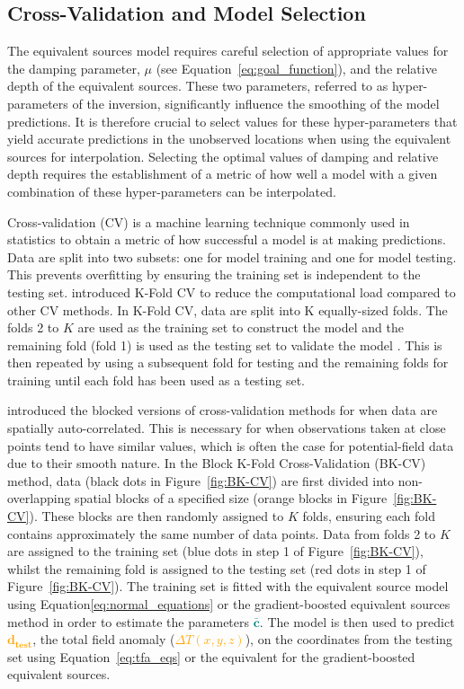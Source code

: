 \subsection{Cross-Validation and Model Selection}

The equivalent sources model requires careful selection of appropriate values for the damping parameter, $\mu$ (see Equation~\ref{eq:goal_function}), and the relative depth of the equivalent sources. 
These two parameters, referred to as hyper-parameters of the inversion, significantly influence the smoothing of the model predictions. It is therefore crucial to select values for these hyper-parameters that yield accurate predictions in the unobserved locations when using the equivalent sources for interpolation. Selecting the optimal values of damping and relative depth requires the establishment of a metric of how well a model with a given combination of these hyper-parameters can be interpolated.

Cross-validation (CV) is a machine learning technique commonly used in statistics to obtain a metric of how successful a model is at making predictions. Data are split into two subsets: one for model training and one for model testing. This prevents overfitting by ensuring the training set is independent to the testing set. \citet{Geisser1975} introduced K-Fold CV to reduce the computational load compared to other CV methods. In K-Fold CV, data are split into K equally-sized folds. The folds 2 to $K$ are used as the training set to construct the model and the remaining fold (fold 1) is used as the testing set to validate the model \citep{Jung2017}. This is then repeated by using a subsequent fold for testing and the remaining folds for training until each fold has been used as a testing set.

\citet{Roberts2017} introduced the blocked versions of cross-validation methods for when data are spatially auto-correlated. This is necessary for when observations taken at close points tend to have similar values, which is often the case for potential-field data due to their smooth nature. In the Block K-Fold Cross-Validation (BK-CV) method, data (black dots in Figure~\ref{fig:BK-CV}) are first divided into non-overlapping spatial blocks of a specified size (orange blocks in Figure~\ref{fig:BK-CV}). These blocks are then randomly assigned to $K$ folds, ensuring each fold contains approximately the same number of data points. Data from folds 2 to $K$ are assigned to the training set (blue dots in step 1 of Figure~\ref{fig:BK-CV}), whilst the remaining fold is assigned to the testing set (red dots in step 1 of Figure~\ref{fig:BK-CV}). The training set is fitted with the equivalent source model using Equation\ref{eq:normal_equations} or the gradient-boosted equivalent sources method in order to estimate the parameters \textcolor{teal}{$\bar{\mathbf{c}}$}. The model is then used to predict \textcolor{orange}{$\mathbf{d_{test}}$}, the total field anomaly (\textcolor{orange}{$\Delta T (x, y, z)$}), on the coordinates from the testing set using Equation~\ref{eq:tfa_eqs} or the equivalent for the gradient-boosted equivalent sources.

